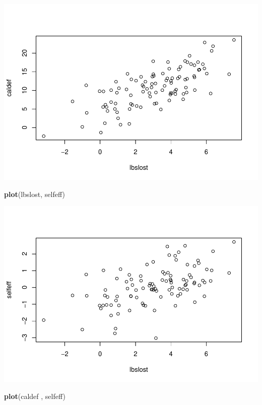 \documentclass[]{article}
\newenvironment{Shaded}{\begin{snugshade}}{\end{snugshade}}
\newcommand{\KeywordTok}[1]{\textcolor[rgb]{0.13,0.29,0.53}{\textbf{#1}}}
\newcommand{\NormalTok}[1]{#1}
\begin{document}
\includegraphics{wtloss_notebook_files/figure-latex/unnamed-chunk-8-1.pdf}

\begin{Shaded}
\begin{Highlighting}[]
\KeywordTok{plot}\NormalTok{(lbslost, selfeff)}
\end{Highlighting}
\end{Shaded}

\includegraphics{wtloss_notebook_files/figure-latex/unnamed-chunk-8-2.pdf}

\begin{Shaded}
\begin{Highlighting}[]
\KeywordTok{plot}\NormalTok{(caldef , selfeff)}
\end{Highlighting}
\end{Shaded}
\end{document}
